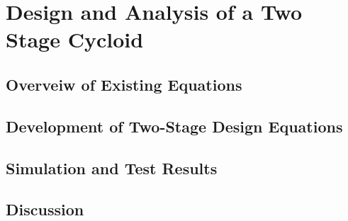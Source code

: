
\chapter{Design and Analysis of a Two Stage Cycloid}\label{ch:dual}

\section{Overveiw of Existing Equations} \label{ch:dual:initial_equations}

\section{Development of Two-Stage Design Equations} \label{ch:dual:equations}


\section{Simulation and Test Results} \label{dual:test_results}

\section{Discussion} \label{dual:discussion}
